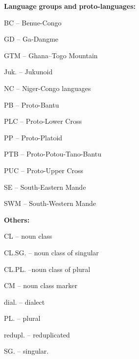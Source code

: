 \textbf{Language} \textbf{groups} \textbf{and} \textbf{proto-languages:}

BC – Benue-Congo

GD – Ga-Dangme

GTM – Ghana–Togo Mountain

Juk. – Jukunoid

NC – Niger-Congo languages

PB – Proto-Bantu

PLC – Proto-Lower Cross

PP – Proto-Platoid

PTB – Proto-Potou-Tano-Bantu

PUC – Proto-Upper Cross

SE – South-Eastern Mande

SWM – South-Western Mande

\textbf{Others:}

CL – noun class

CL.SG. – noun class of singular

CL.PL. –noun class of plural

CM – noun class marker

dial.  – dialect

PL. – plural

redupl. – reduplicated

SG. – singular.